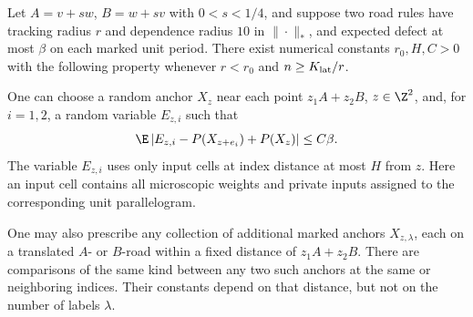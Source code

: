 \begin{lemma}
\label{found:lem-network}
Let $A=v+sw$, $B=w+sv$ with $0<s<1/4$, and suppose two road rules have
tracking radius $r$ and dependence radius $10$ in $\|\cdot\|_*$, and
expected defect at most $\beta$ on each marked unit period.  There
exist numerical constants $r_0,H,C>0$ with the following property
whenever $r<r_0$ and $n\geq K_{\rm lat}/r$.

One can choose a random anchor $X_z$ near each point $z_1A+z_2B$,
$z\in\Z^2$, and, for $i=1,2$, a random variable $E_{z,i}$ such
that
\begin{equation}
 \E \left|E_{z,i}-P(X_{z+e_i})+P(X_z)\right|
 \leq C\beta.                                      \label{found:eq-increment}
\end{equation}
The variable $E_{z,i}$ uses only input cells at index distance at most
$H$ from $z$.  Here an input cell contains all microscopic weights and
private inputs assigned to the corresponding unit parallelogram.

One may also prescribe any collection of additional marked anchors
$X_{z,\lambda}$, each on a translated $A$- or $B$-road within a fixed
distance of $z_1A+z_2B$.  There are comparisons of the same kind between
any two such anchors at the same or neighboring indices.  Their constants
depend on that distance, but not on the number of labels $\lambda$.
\end{lemma}

